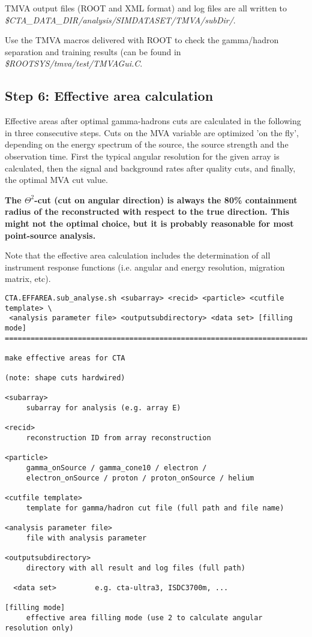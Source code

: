 \documentclass[titlepage,a4paper,twoside,11pt]{report}
\begin{document}
TMVA output files (ROOT and XML format) and log files are all written to \\
{\it \$CTA\_DATA\_DIR/analysis/SIMDATASET/TMVA/subDir/}.

Use the TMVA macros delivered with ROOT to check the gamma/hadron separation and training results (can be found in {\it \$ROOTSYS/tmva/test/TMVAGui.C}.


\subsection{Step 6: Effective area calculation}

Effective areas after optimal gamma-hadrons cuts are calculated in the following in three consecutive steps.
Cuts on the MVA variable are optimized 'on the fly', 
depending on the energy spectrum of the source, the source strength and the observation time.
First the typical angular resolution for the given array is calculated, then the signal and background 
rates after quality cuts, and finally, the optimal MVA cut value.

{\bf The $\Theta^2$-cut (cut on angular direction) is always the 80\% containment radius of the reconstructed with respect to the true direction. This might not the optimal choice, but it is probably reasonable for most point-source analysis.}

Note that the effective area calculation includes the determination of all instrument response functions (i.e. angular and energy resolution, migration matrix, etc).

\begin{lstlisting}
CTA.EFFAREA.sub_analyse.sh <subarray> <recid> <particle> <cutfile template> \
 <analysis parameter file> <outputsubdirectory> <data set> [filling mode]
================================================================================

make effective areas for CTA

(note: shape cuts hardwired)

<subarray>
     subarray for analysis (e.g. array E)

<recid>
     reconstruction ID from array reconstruction

<particle>
     gamma_onSource / gamma_cone10 / electron / 
     electron_onSource / proton / proton_onSource / helium 

<cutfile template>
     template for gamma/hadron cut file (full path and file name)

<analysis parameter file>
     file with analysis parameter

<outputsubdirectory>
     directory with all result and log files (full path)

  <data set>         e.g. cta-ultra3, ISDC3700m, ...  

[filling mode]
     effective area filling mode (use 2 to calculate angular resolution only)
\end{lstlisting}
\end{document}
